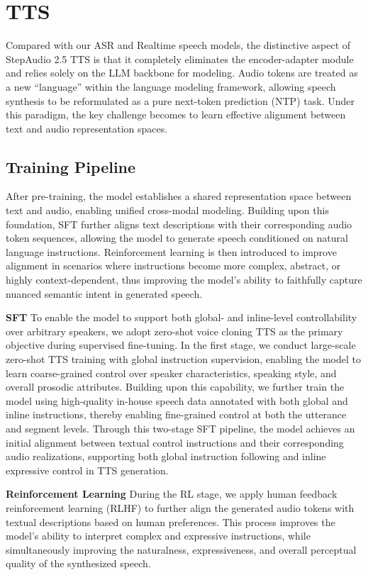 \section{TTS}
\label{sec:tts}
Compared with our ASR and Realtime speech models, the distinctive aspect of StepAudio 2.5 TTS is that it completely eliminates the encoder-adapter module and relies solely on the LLM backbone for modeling. Audio tokens are treated as a new “language” within the language modeling framework, allowing speech synthesis to be reformulated as a pure next-token prediction (NTP) task. Under this paradigm, the key challenge becomes to learn effective alignment between text and audio representation spaces.
\subsection{Training Pipeline}
\label{sec:pipeline}


After pre-training, the model establishes a shared representation space between text and audio, enabling unified cross-modal modeling. Building upon this foundation, SFT further aligns text descriptions with their corresponding audio token sequences, allowing the model to generate speech conditioned on natural language instructions. Reinforcement learning is then introduced to improve alignment in scenarios where instructions become more complex, abstract, or highly context-dependent, thus improving the model’s ability to faithfully capture nuanced semantic intent in generated speech.


\textbf{SFT}
To enable the model to support both global- and inline-level controllability over arbitrary speakers, we adopt zero-shot voice cloning TTS as the primary objective during supervised fine-tuning. In the first stage, we conduct large-scale zero-shot TTS training with global instruction supervision, enabling the model to learn coarse-grained control over speaker characteristics, speaking style, and overall prosodic attributes. Building upon this capability, we further train the model using high-quality in-house speech data annotated with both global and inline instructions, thereby enabling fine-grained control at both the utterance and segment levels. Through this two-stage SFT pipeline, the model achieves an initial alignment between textual control instructions and their corresponding audio realizations, supporting both global instruction following and inline expressive control in TTS generation.

\textbf{Reinforcement Learning}
During the RL stage, we apply human feedback reinforcement learning (RLHF) to further align the generated audio tokens with textual descriptions based on human preferences. This process improves the model’s ability to interpret complex and expressive instructions, while simultaneously improving the naturalness, expressiveness, and overall perceptual quality of the synthesized speech. 

